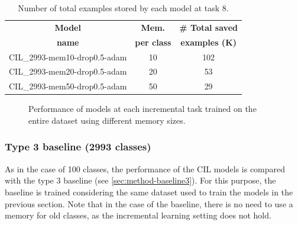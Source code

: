 \begin{table}[H]
    \centering
    \begin{tabular}{c|c|c}
        \hline
        \textbf{Model} &
        \textbf{Mem.} &
        \textbf{\# Total saved} \\
        \textbf{name} &
        \textbf{per class} &
        \textbf{examples (K)} \\
        \hline
        \hline
CIL\_2993-mem10-drop0.5-adam&10&102\\
CIL\_2993-mem20-drop0.5-adam&20&53\\
CIL\_2993-mem50-drop0.5-adam&50&29\\
        \hline
    \end{tabular}
    \caption{Number of total examples stored by each model at task 8.}
    \label{table:exp6-memsize}
\end{table}


\begin{figure}[H]
	\centering
	\caption{Performance of models at each incremental task trained on the entire dataset using different memory sizes.}%
	\label{fig:exp6}%
\end{figure}


\subsubsection{Type 3 baseline (2993 classes)}
As in the case of 100 classes, the performance of the CIL models is compared with the type 3 baseline (see \autoref{sec:method-baseline3}).
For this purpose, the baseline is trained considering the same dataset used to train the models in the previous section.
Note that in the case of the baseline, there is no need to use a memory for old classes, as the incremental learning setting does not hold.
 
